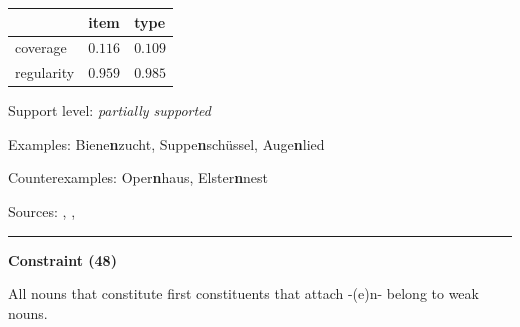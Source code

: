 \vspace{-0.25em}

\begin{table}[!ht]
\begin{center}
\setlength{\extrarowheight}{1pt}
\begin{tabularx}{\columnwidth}{|X|X|X|}
\hline
 & item & type \\
\hline
 coverage & $0.116$ & $0.109$ \\
\hline
 regularity & $0.959$ & $0.985$ \\
\hline
\end{tabularx}
\end{center}
\end{table}

\vspace{-1.35em}

\noindent
Support level: \textit{partially supported}

\vspace{0.3em}

\noindent
Examples: Biene\textbf{n}zucht, Suppe\textbf{n}schüssel, Auge\textbf{n}lied

\noindent
Counterexamples: Oper\textbf{n}haus, Elster\textbf{n}nest

\vspace{0.3em}

\noindent
Sources: \citet[18]{kuerschner_2010}, \citet[84]{nuebling_szczepaniak_2013}, \citet[179]{wegener_2005}

\vspace{0.35em}
\hrule




\vspace{0.4em}

\begin{center}
\textbf{Constraint (48)}
\end{center}

\noindent
All nouns that constitute first constituents that attach -(e)n- belong to weak nouns.
\vspace{0.5em}


